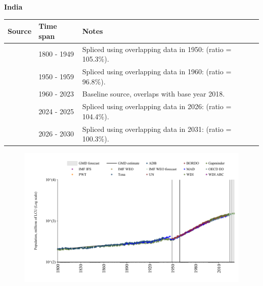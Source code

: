\documentclass[12pt,a4paper,landscape]{article}
\begin{document}
\begin{adjustbox}{max totalsize={\paperwidth}{\paperheight},center}
\begin{minipage}[t][\textheight][t]{\textwidth}
\vspace*{0.5cm}
{}
\begin{center}
{\Large\bfseries India}
\end{center}
\vspace{0.5cm}
\begin{table}[H]
\centering
\small
\begin{tabular}{|l|l|l|}
\hline
\textbf{Source} & \textbf{Time span} & \textbf{Notes} \\
\hline
\rowcolor{white}\cite{Gapminder}& 1800 - 1949 &Spliced using overlapping data in 1950: (ratio = 105.3\%).\\
\rowcolor{lightgray}\cite{IMF_IFS}& 1950 - 1959 &Spliced using overlapping data in 1960: (ratio = 96.8\%).\\
\rowcolor{white}\cite{WDI}& 1960 - 2023 &Baseline source, overlaps with base year 2018.\\
\rowcolor{lightgray}\cite{OECD_EO}& 2024 - 2025 &Spliced using overlapping data in 2026: (ratio = 104.4\%).\\
\rowcolor{white}\cite{Gapminder}& 2026 - 2030 &Spliced using overlapping data in 2031: (ratio = 100.3\%).\\
\hline
\end{tabular}
\end{table}
\begin{figure}[H]
\centering
\includegraphics[width=\textwidth,height=0.6\textheight,keepaspectratio]{graphs/IND_pop.pdf}
\end{figure}
\end{minipage}
\end{adjustbox}
\end{document}
